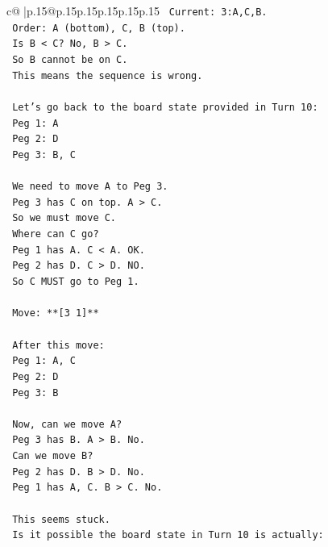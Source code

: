 \documentclass{article}
\begin{document}
{\begin{supertabular}{c@{$\;$}|p{.15\linewidth}@{}p{.15\linewidth}p{.15\linewidth}p{.15\linewidth}p{.15\linewidth}p{.15\linewidth}}
{{{\texttt{            Current: 3:A,C,B.} \\
\texttt{            Order: A (bottom), C, B (top).} \\
\texttt{            Is B < C? No, B > C.} \\
\texttt{            So B cannot be on C.} \\
\texttt{            This means the sequence is wrong.} \\
\\ 
\texttt{            Let's go back to the board state provided in Turn 10:} \\
\texttt{            Peg 1: A} \\
\texttt{            Peg 2: D} \\
\texttt{            Peg 3: B, C} \\
\\ 
\texttt{            We need to move A to Peg 3.} \\
\texttt{            Peg 3 has C on top. A > C.} \\
\texttt{            So we must move C.} \\
\texttt{            Where can C go?} \\
\texttt{            Peg 1 has A. C < A. OK.} \\
\texttt{            Peg 2 has D. C > D. NO.} \\
\texttt{            So C MUST go to Peg 1.} \\
\\ 
\texttt{            Move: **{[}3 1{]}**} \\
\\ 
\texttt{            After this move:} \\
\texttt{            Peg 1: A, C} \\
\texttt{            Peg 2: D} \\
\texttt{            Peg 3: B} \\
\\ 
\texttt{            Now, can we move A?} \\
\texttt{            Peg 3 has B. A > B. No.} \\
\texttt{            Can we move B?} \\
\texttt{            Peg 2 has D. B > D. No.} \\
\texttt{            Peg 1 has A, C. B > C. No.} \\
\\ 
\texttt{            This seems stuck.} \\
\texttt{            Is it possible the board state in Turn 10 is actually:} \\
}}}
\end{supertabular}}
\end{document}

